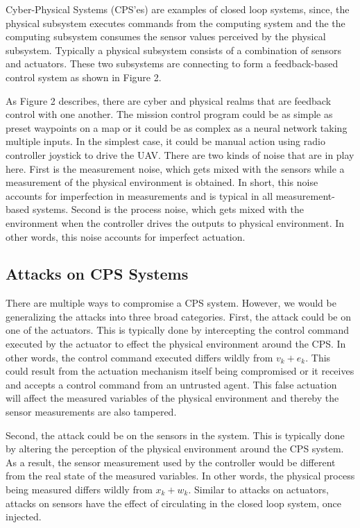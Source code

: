 Cyber-Physical Systems (CPS'es) are examples of closed loop systems, since, the physical subsystem executes commands from the computing system and the the computing subsystem consumes the sensor values perceived by the physical subsystem. Typically a physical subsystem consists of a combination of sensors and actuators. These two subsystems are connecting to form a feedback-based control system as shown in Figure 2. 


As Figure 2 describes, there are cyber and physical realms that are feedback control with one another. The mission control program could be as simple as preset waypoints on a map or it could be as complex as a neural network taking multiple inputs. In the simplest case, it could be manual action using radio controller joystick to drive the UAV.  There are two kinds of noise that are in play here. First is the measurement noise, which gets mixed with the sensors while a measurement of the physical environment is obtained. In short, this noise accounts for imperfection in measurements and is typical in all measurement-based systems. Second is the process noise, which gets mixed with the environment when the controller drives the outputs to physical environment. In other words, this noise accounts for imperfect actuation.

\subsection{Attacks on CPS Systems}
There are multiple ways to compromise a CPS system. However, we would be generalizing the attacks into three broad categories. First, the attack could be on one of the actuators. This is typically done by intercepting the control command executed by the actuator to effect the physical environment around the CPS. In other words, the control command executed differs wildly from $v_k + e_k$. This could result from the actuation mechanism itself being compromised or it receives and accepts a control command from an untrusted agent. This false actuation will affect the measured variables of the physical environment and thereby the sensor measurements are also tampered.

Second, the attack could be on the sensors in the system. This is typically done by altering the perception of the physical environment around the CPS system. As a result, the sensor measurement used by the controller would be different from the real state of the measured variables. In other words, the physical process being measured differs wildly from $x_k + w_k$. Similar to attacks on actuators, attacks on sensors have the effect of circulating in the closed loop system, once injected.

